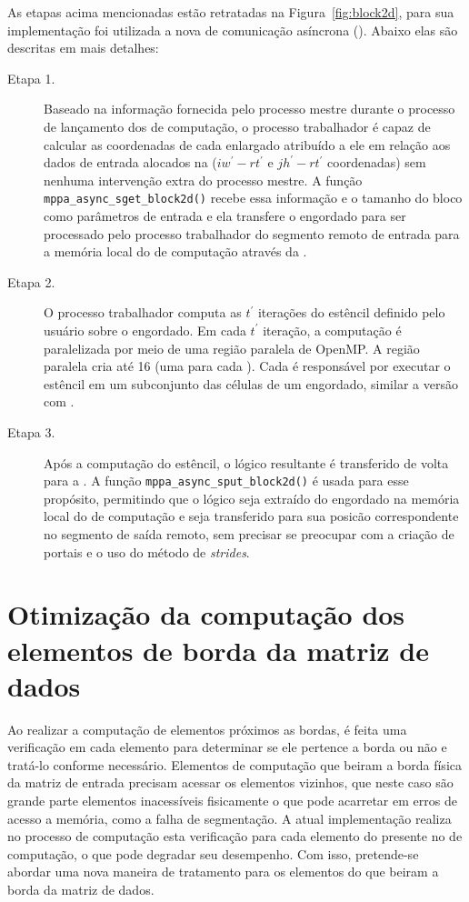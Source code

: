 As etapas acima mencionadas estão retratadas na Figura~\ref{fig:block2d}, para sua implementação foi utilizada a nova \api de comunicação asíncrona (\async). Abaixo elas são descritas em mais detalhes:

\begin{description}

	\item[Etapa 1.] Baseado na informação fornecida pelo processo mestre durante o processo de lançamento dos \clusters de computação, o processo trabalhador é capaz de calcular as coordenadas de cada \tile enlargado atribuído a ele em relação aos dados de entrada alocados na \lpddr ($iw^\prime - rt^\prime$ e $jh^\prime - rt^\prime$ coordenadas) sem nenhuma intervenção extra do processo mestre. A função \texttt{mppa\_async\_sget\_block2d()} recebe essa informação e o tamanho do bloco como parâmetros de entrada e ela transfere o \tile engordado para ser processado pelo processo trabalhador do segmento remoto de entrada para a memória local do \cluster de computação através da \noc.

	\item[Etapa 2.] O processo trabalhador computa as $t^\prime$ iterações do  estêncil definido pelo usuário sobre o \tile engordado. Em cada $t^\prime$ iteração, a computação é paralelizada por meio de uma região paralela de OpenMP. A região paralela cria até 16 \threads (uma para cada \pe). Cada \pe é responsável por executar o  estêncil em um subconjunto das células de um \tile engordado, similar a versão com \ipc.

	\item[Etapa 3.] Após a computação do  estêncil, o \tile lógico resultante é transferido de volta para a \lpddr. A função \texttt{mppa\_async\_sput\_block2d()} é usada para esse propósito, permitindo que o \tile lógico seja extraído do \tile engordado na memória local do \cluster de computação e seja transferido para sua posicão correspondente no segmento de saída remoto, sem precisar se preocupar com a criação de portais e o uso do método de \textit{strides}.

\end{description}

\section{Otimização da computação dos elementos de borda da matriz de dados}
\label{sec:otimizacao-bordas}

Ao realizar a computação de elementos próximos as bordas, é feita uma verificação em cada elemento para determinar se ele pertence a borda ou não e tratá-lo conforme necessário. Elementos de computação que beiram a borda física da matriz de entrada precisam acessar os elementos vizinhos, que neste caso são grande parte elementos inacessíveis fisicamente o que pode acarretar em erros de acesso a memória, como a falha de segmentação. A atual implementação realiza no processo de computação esta verificação para cada elemento do \tile presente no \cluster de computação, o que pode degradar seu desempenho. Com isso, pretende-se abordar uma nova maneira de tratamento para os elementos do \tile que beiram a borda da matriz de dados. 

